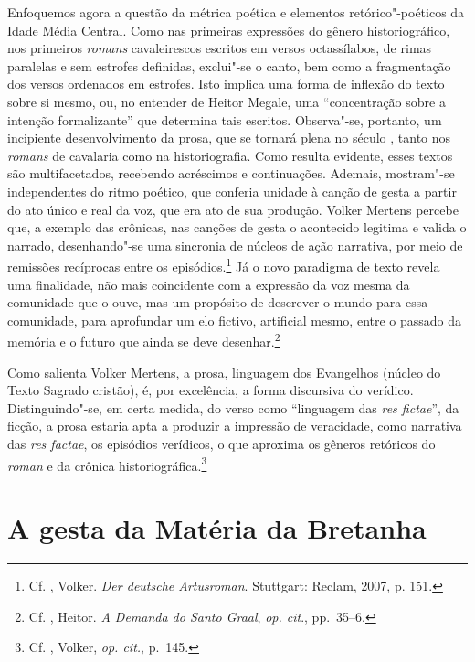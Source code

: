 Enfoquemos agora a questão da métrica poética e elementos retórico"-poéticos da
Idade Média Central. Como nas primeiras expressões do gênero historiográfico,
nos primeiros \textit{romans} cavaleirescos escritos em versos octassílabos, de
rimas paralelas e sem estrofes definidas, exclui"-se o canto, bem como a
fragmentação dos versos ordenados em estrofes. Isto implica uma forma de
inflexão do texto sobre si mesmo, ou, no entender de Heitor Megale, uma
“concentração sobre a intenção formalizante” que determina tais escritos.
Observa"-se, portanto, um incipiente desenvolvimento da prosa, que se tornará
plena no século , tanto nos \textit{romans} de cavalaria como na
historiografia. Como resulta evidente, esses textos são multifacetados,
recebendo acréscimos e continuações. Ademais, mostram"-se independentes do ritmo
poético, que conferia unidade à canção de gesta a partir do ato único e real da
voz, que era ato de sua produção. Volker Mertens percebe que, a exemplo das
crônicas, nas canções de gesta o acontecido legitima e valida o narrado,
desenhando"-se uma sincronia de núcleos de ação narrativa, por meio de remissões
recíprocas entre os episódios.\footnote{ Cf.  , Volker. \textit{Der
deutsche Artusroman}. Stuttgart: Reclam, 2007, p.  151. } Já o novo paradigma
de texto revela uma finalidade, não mais coincidente com a expressão da voz
mesma da comunidade que o ouve, mas um propósito de descrever o mundo para essa
comunidade, para aprofundar um elo fictivo, artificial mesmo, entre o passado da
memória e o futuro que ainda se deve desenhar.\footnote{ Cf. , Heitor. \textit{A Demanda do Santo Graal},
\textit{op. cit}., pp.~35--6.} 

Como salienta Volker Mertens, a prosa, linguagem dos Evangelhos (núcleo do Texto Sagrado cristão), é, por excelência, a
forma discursiva do verídico. Distinguindo"-se, em certa medida, do verso como
“linguagem das \textit{res fictae}”, da ficção, a prosa estaria apta a produzir
a impressão de veracidade, como narrativa das \textit{res factae}, os episódios
verídicos, o que aproxima os gêneros retóricos do \textit{roman} e da crônica
historiográfica.\footnote{ Cf. , Volker,\textit{ op. cit.}, p.~145. } 

\section{A gesta da Matéria da Bretanha}

